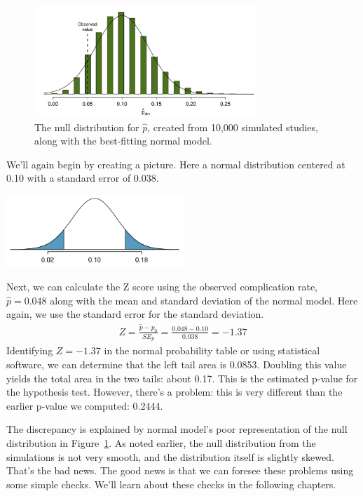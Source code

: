 \begin{figure}
\centering
\includegraphics[width=0.75\textwidth]{02/figures/MedicalConsultant/MedConsNullSim_w_normal}
\caption{The null distribution for $\hat{p}$, created from 10,000 simulated studies, along with the best-fitting normal model.}
\label{MedConsNullSim_w_normal}
\end{figure}

We'll again begin by creating a picture. Here a normal distribution centered at 0.10 with a standard error of 0.038.
\begin{center}
\includegraphics[width=0.5\textwidth]{02/figures/MedicalConsultant/MedConsNullSim_normal_only}
\end{center}
Next, we can calculate the Z score using the observed complication rate, $\hat{p} = 0.048$ along with the mean and standard deviation of the normal model. Here again, we use the standard error for the standard deviation.
\begin{align*}
Z = \frac{\hat{p} - p_0}{SE_{\hat{p}}} = \frac{0.048 - 0.10}{0.038} = -1.37
\end{align*}
Identifying $Z = -1.37$ in the normal probability table or using statistical software, we can determine that the left tail area is 0.0853. Doubling this value yields the total area in the two tails: about 0.17. This is the estimated p-value for the hypothesis test. However, there's a problem: this is very different than the earlier p-value we computed: 0.2444.

The discrepancy is explained by normal model's poor representation of the null distribution in Figure~\ref{MedConsNullSim_w_normal}. As noted earlier, the null distribution from the simulations is not very smooth, and the distribution itself is slightly skewed. That's the bad news. The good news is that we can foresee these problems using some simple checks. We'll learn about these checks in the following chapters.

